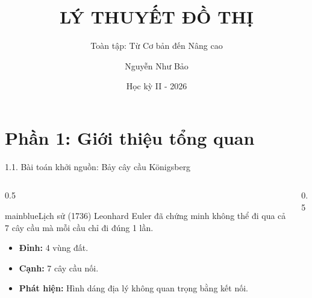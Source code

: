 \documentclass[10pt, xcolor={dvipsnames}]{beamer}
\title{LÝ THUYẾT ĐỒ THỊ}
\subtitle{Toàn tập: Từ Cơ bản đến Nâng cao}
\author{Nguyễn Như Bảo}
\date{Học kỳ II - 2026}
\begin{document}
\frame{\titlepage}

\section{Phần 1: Giới thiệu tổng quan}

\begin{frame}{1.1. Bài toán khởi nguồn: Bảy cây cầu Königsberg}
    \begin{columns}
        \begin{column}{0.5\textwidth}
            \begin{detailbox}{mainblue}{Lịch sử (1736)}
                Leonhard Euler đã chứng minh không thể đi qua cả 7 cây cầu mà mỗi cầu chỉ đi đúng 1 lần.
            \end{detailbox}
            \begin{itemize}
                \item \textbf{Đỉnh:} 4 vùng đất.
                \item \textbf{Cạnh:} 7 cây cầu nối.
                \item \textbf{Phát hiện:} Hình dáng địa lý không quan trọng bằng kết nối.
            \end{itemize}
        \end{column}
        \begin{column}{0.5\textwidth}
            \centering
        \end{column}
    \end{columns}
\end{frame}
\end{document}
